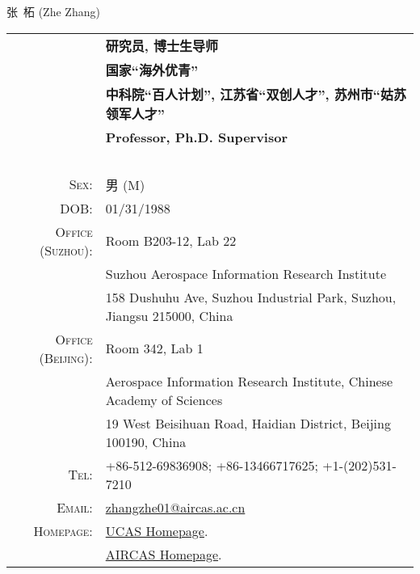 \documentclass[paper=a4,fontsize=11pt]{scrartcl}
\newcommand{\sepspace}{\vspace*{1em}}		%
\newcommand{\MyName}[1]{
		\Huge \usefont{OT1}{phv}{b}{n} \hfill #1 		%
		\par \normalsize \normalfont}
\newcommand{\MySlogan}[1]{
		\large \usefont{OT1}{phv}{m}{n}\hfill \textit{#1} %
		\par \normalsize \normalfont}
\begin{document}

\MyName{张~柘 (Zhe Zhang)}

\sepspace


\begin{tabular}{rl}
	& \textbf{研究员, 博士生导师} \\
	& \textbf{国家``海外优青''} \\
	& \textbf{中科院``百人计划'', 江苏省``双创人才'', 苏州市``姑苏领军人才''} \\
	& \textbf{Professor, Ph.D. Supervisor} \\
	~&~\\
\textsc{Sex:} & 男 (M) \\
\textsc{DOB:} & 01/31/1988 \\
\textsc{Office (Suzhou):} &  Room B203-12, Lab 22 \\
	& Suzhou Aerospace Information Research Institute \\
	& 158 Dushuhu Ave, Suzhou Industrial Park, Suzhou, Jiangsu 215000, China \\
\textsc{Office (Beijing):}	&  Room 342, Lab 1 \\
	& Aerospace Information Research Institute, Chinese Academy of Sciences \\
	& 19 West Beisihuan Road, Haidian District, Beijing 100190, China \\
\textsc{Tel:} & +86-512-69836908; +86-13466717625; +1-(202)531-7210\\
\textsc{Email:} & \href{mailto:zhangzhe01@aircas.ac.cn}{zhangzhe01@aircas.ac.cn} \\
\textsc{Homepage:} & \href{https://people.ucas.ac.cn/~zhe}{UCAS Homepage}. \\
	& \href{http://www.aircas.cas.cn/sourcedb_air_cas/cn/expert/yjy/202308/t20230803_6853650.html}{AIRCAS Homepage}.
\end{tabular}

\end{document}
